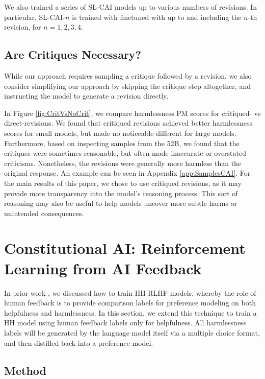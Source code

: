 We also trained a series of SL-CAI models up to various numbers of revisions. In particular, SL-CAI-$n$ is trained with finetuned with up to and including the $n$-th revision, for $n=1,2,3,4$.

\subsection{Are Critiques Necessary?}
\label{sec:AreCritiquesNecessary}

While our approach requires sampling a critique followed by a revision, we also consider simplifying our approach by skipping the critique step altogether, and instructing the model to generate a revision directly.

In Figure \ref{fig:CritVsNoCrit}, we compare harmlessness PM scores for critiqued- vs direct-revisions. We found that critiqued revisions achieved better harmlessness scores for small models, but made no noticeable different for large models. Furthermore, based on inspecting samples from the 52B, we found that the critiques were sometimes reasonable, but often made inaccurate or overstated criticisms. Nonetheless, the revisions were generally more harmless than the original response. An example can be seen in Appendix \ref{app:SamplesCAI}. For the main results of this paper, we chose to use critiqued revisions, as it may provide more transparency into the model's reasoning process.  This sort of reasoning may also be useful to help models uncover more subtle harms or unintended consequences.

\section{Constitutional AI: Reinforcement Learning from AI Feedback}
\label{sec:RLCAI}

In prior work \cite{bai2022training}, we discussed how to train HH RLHF models, whereby the role of human feedback is to provide comparison labels for preference modeling on both helpfulness and harmlessness. In this section, we extend this technique to train a HH model using human feedback labels only for helpfulness. All harmlessness labels will be generated by the language model itself via a multiple choice format, and then distilled back into a preference model.

\subsection{Method}
\label{sec:RLMethod}

